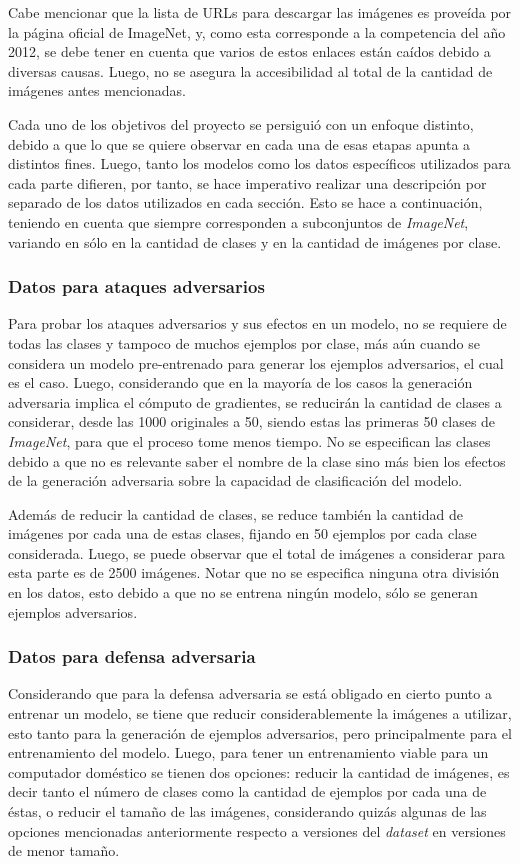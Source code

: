 \documentclass[conference]{IEEEtran}
\begin{document}
Cabe mencionar que la lista de URLs para descargar las imágenes es proveída por la página oficial de ImageNet, y, como esta corresponde a la competencia del año 2012, se debe tener en cuenta que varios de estos enlaces están caídos debido a diversas causas. Luego, no se asegura la accesibilidad al total de la cantidad de imágenes antes mencionadas.

Cada uno de los objetivos del proyecto se persiguió con un enfoque distinto, debido a que lo que se quiere observar en cada una de esas etapas apunta a distintos fines. Luego, tanto los modelos como los datos específicos utilizados para cada parte difieren, por tanto, se hace imperativo realizar una descripción por separado de los datos utilizados en cada sección. Esto se hace a continuación, teniendo en cuenta que siempre corresponden a subconjuntos de \textit{ImageNet}, variando en sólo en la cantidad de clases y en la cantidad de imágenes por clase.

\subsubsection{Datos para ataques adversarios}
Para probar los ataques adversarios y sus efectos en un modelo, no se requiere de todas las clases y tampoco de muchos ejemplos por clase, más aún cuando se considera un modelo pre-entrenado para generar los ejemplos adversarios, el cual es el caso. Luego, considerando que en la mayoría de los casos la generación adversaria implica el cómputo de gradientes, se reducirán la cantidad de clases a considerar, desde las 1000 originales a 50, siendo estas las primeras 50 clases de \textit{ImageNet}, para que el proceso tome menos tiempo. No se especifican las clases debido a que no es relevante saber el nombre de la clase sino más bien los efectos de la generación adversaria sobre la capacidad de clasificación del modelo.

Además de reducir la cantidad de clases, se reduce también la cantidad de imágenes por cada una de estas clases, fijando en 50 ejemplos por cada clase considerada. Luego, se puede observar que el total de imágenes a considerar para esta parte es de 2500 imágenes. Notar que no se especifica ninguna otra división en los datos, esto debido a que no se entrena ningún modelo, sólo se generan ejemplos adversarios.

\subsubsection{Datos para defensa adversaria}
Considerando que para la defensa adversaria se está obligado en cierto punto a entrenar un modelo, se tiene que reducir considerablemente la imágenes a utilizar, esto tanto para la generación de ejemplos adversarios, pero principalmente para el entrenamiento del modelo. Luego, para tener un entrenamiento viable para un computador doméstico se tienen dos opciones: reducir la cantidad de imágenes, es decir tanto el número de clases como la cantidad de ejemplos por cada una de éstas, o reducir el tamaño de las imágenes, considerando quizás algunas de las opciones mencionadas anteriormente respecto a versiones del \textit{dataset} en versiones de menor tamaño.
\end{document}

